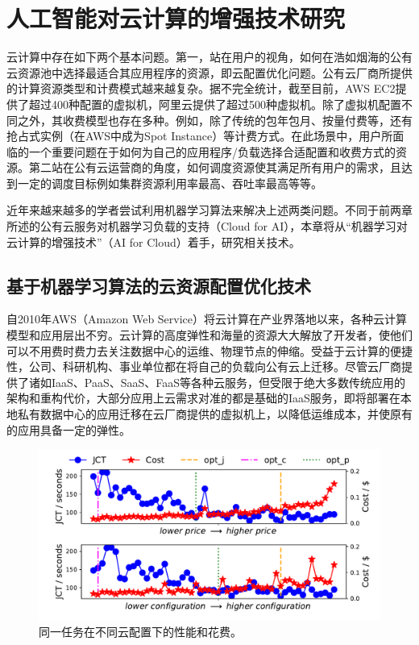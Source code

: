 \chapter{人工智能对云计算的增强技术研究}
云计算中存在如下两个基本问题。第一，站在用户的视角，如何在浩如烟海的公有云资源池中选择最适合其应用程序的资源，即云配置优化问题。公有云厂商所提供的计算资源类型和计费模式越来越复杂。据不完全统计，截至目前，AWS EC2提供了超过400种配置的虚拟机，阿里云提供了超过500种虚拟机。除了虚拟机配置不同之外，其收费模型也存在多种。例如，除了传统的包年包月、按量付费等，还有抢占式实例（在AWS中成为Spot Instance）等计费方式。在此场景中，用户所面临的一个重要问题在于如何为自己的应用程序/负载选择合适配置和收费方式的资源。第二站在公有云运营商的角度，如何调度资源使其满足所有用户的需求，且达到一定的调度目标例如集群资源利用率最高、吞吐率最高等等。

近年来越来越多的学者尝试利用机器学习算法来解决上述两类问题。不同于前两章所述的公有云服务对机器学习负载的支持（Cloud for AI），本章将从“机器学习对云计算的增强技术”（AI for Cloud）着手，研究相关技术。
\section{基于机器学习算法的云资源配置优化技术}
自2010年AWS（Amazon Web Service）将云计算在产业界落地以来，各种云计算模型和应用层出不穷。云计算的高度弹性和海量的资源大大解放了开发者，使他们可以不用费时费力去关注数据中心的运维、物理节点的伸缩。受益于云计算的便捷性，公司、科研机构、事业单位都在将自己的负载向公有云上迁移。尽管云厂商提供了诸如IaaS、PaaS、SaaS、FaaS等各种云服务，但受限于绝大多数传统应用的架构和重构代价，大部分应用上云需求对准的都是基础的IaaS服务，即将部署在本地私有数据中心的应用迁移在云厂商提供的虚拟机上，以降低运维成本，并使原有的应用具备一定的弹性。

\begin{figure}[h]
    \centerline{\includegraphics[width=\textwidth]{figures/mis_conf_effect.pdf}}
    \caption{同一任务在不同云配置下的性能和花费。}
    \label{mis_conf_effect}
\end{figure}

